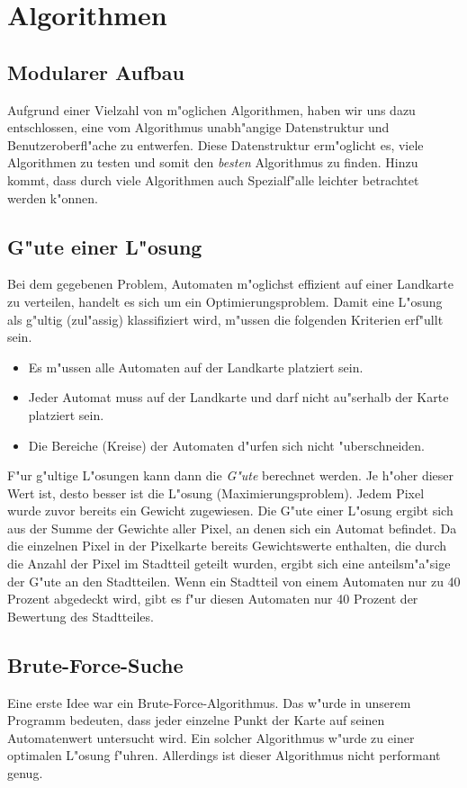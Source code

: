 \section{Algorithmen}
\subsection{Modularer Aufbau}
Aufgrund einer Vielzahl von m"oglichen Algorithmen, haben wir uns dazu entschlossen, eine vom Algorithmus unabh"angige Datenstruktur und Benutzeroberfl"ache zu entwerfen. Diese Datenstruktur erm"oglicht es, viele Algorithmen zu testen und somit den \emph{besten} Algorithmus zu finden. Hinzu kommt, dass durch viele Algorithmen auch Spezialf"alle leichter betrachtet werden k"onnen.

\subsection{G"ute einer L"osung}
Bei dem gegebenen Problem, Automaten m"oglichst effizient auf einer Landkarte zu verteilen, handelt es sich um ein Optimierungsproblem. Damit eine L"osung als g"ultig (zul"assig) klassifiziert wird, m"ussen die folgenden Kriterien erf"ullt sein.
\begin{itemize}
\item Es m"ussen alle Automaten auf der Landkarte platziert sein.
\item Jeder Automat muss auf der Landkarte und darf nicht au"serhalb der Karte platziert sein.
\item Die Bereiche (Kreise) der Automaten d"urfen sich nicht "uberschneiden.
\end{itemize}
F"ur g"ultige L"osungen kann dann die \emph{G"ute} berechnet werden. Je h"oher dieser Wert ist, desto besser ist die L"osung (Maximierungsproblem). Jedem Pixel wurde zuvor bereits ein Gewicht zugewiesen. Die G"ute einer L"osung ergibt sich aus der Summe der Gewichte aller Pixel, an denen sich ein Automat befindet. Da die einzelnen Pixel in der Pixelkarte bereits Gewichtswerte enthalten, die durch die Anzahl der Pixel im Stadtteil geteilt wurden, ergibt sich eine anteilsm"a"sige der G"ute an den Stadtteilen. Wenn ein Stadtteil von einem Automaten nur zu 40 Prozent abgedeckt wird, gibt es f"ur diesen Automaten nur 40 Prozent der Bewertung des Stadtteiles.

\subsection{Brute-Force-Suche}
Eine erste Idee war ein Brute-Force-Algorithmus. Das w"urde in unserem Programm bedeuten, dass jeder einzelne Punkt der Karte auf seinen Automatenwert untersucht wird. Ein solcher Algorithmus w"urde zu einer optimalen L"osung f"uhren. Allerdings ist dieser Algorithmus nicht performant genug. 

